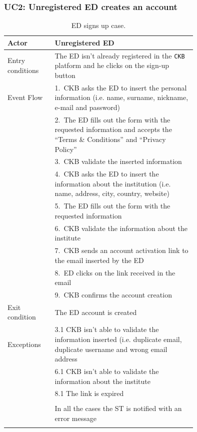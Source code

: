 \subsubsection*{UC2: Unregistered ED creates an account}
\begin{center}
  \begin{longtable}{l|p{0.75\linewidth}}
    \hline
    Actor & Unregistered ED \\
    \hline
    Entry conditions & The ED isn’t already registered in the \verb|CKB| platform and he clicks on the sign-up button \\
    \hline
    Event Flow & 1.\ CKB asks the ED to insert the personal information (i.e. name, surname, nickname, e-mail and password) \\
    & 2.\ The ED fills out the form with the requested information and accepts the “Terms \& Conditions” and “Privacy Policy” \\
    & 3.\ CKB validate the inserted information \\
    & 4.\ CKB asks the ED to insert the information about the institution (i.e. name, address, city, country, website) \\
    & 5.\ The ED fills out the form with the requested information \\
    & 6.\ CKB validate the information about the institute \\
    & 7.\ CKB sends an account activation link to the email inserted by the ED \\
    & 8.\ ED clicks on the link received in the email \\
    & 9.\ CKB confirms the account creation  \\
    \hline
    Exit condition & The ED account is created \\
    \hline
    Exceptions & 3.1 CKB isn’t able to validate the information inserted (i.e. duplicate email, duplicate username and wrong email address \\
    & 6.1 CKB isn’t able to validate the information about the institute \\
    & 8.1 The link is expired \\ \\
    & In all the cases the ST is notified with an error message\\
    \hline
    \caption{ED signs up case.}
    \label{tab: ED_signs_up}
  \end{longtable}


\end{center}
